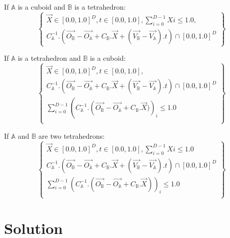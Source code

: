 \documentclass[12pt, a4paper]{article}
\begin{document}
If $\mathbb{A}$ is a cuboid and $\mathbb{B}$ is a tetrahedron:
\begin{equation}
\left\lbrace
\begin{array}{c}
\overrightarrow{X}\in[0.0,1.0]^D,t\in[0.0,1.0],\sum_{i=0}^{D-1}Xi\le1.0,\\
C_\mathbb{A}^{-1}.\left(\overrightarrow{O_\mathbb{B}}-\overrightarrow{O_\mathbb{A}}+C_\mathbb{B}.\overrightarrow{X}+\left(\overrightarrow{V_\mathbb{B}}-\overrightarrow{V_\mathbb{A}}\right).t\right)\cap[0.0,1.0]^D
\end{array}
\right\rbrace
\end{equation}

If $\mathbb{A}$ is a tetrahedron and $\mathbb{B}$ is a cuboid:
\begin{equation}
\left\lbrace
\begin{array}{c}
\overrightarrow{X}\in[0.0,1.0]^D,t\in[0.0,1.0],\\
C_\mathbb{A}^{-1}.\left(\overrightarrow{O_\mathbb{B}}-\overrightarrow{O_\mathbb{A}}+C_\mathbb{B}.\overrightarrow{X}+\left(\overrightarrow{V_\mathbb{B}}-\overrightarrow{V_\mathbb{A}}\right).t\right)\cap[0.0,1.0]^D\\
\sum_{i=0}^{D-1}\left(C_\mathbb{A}^{-1}.\left(\overrightarrow{O_\mathbb{B}}-\overrightarrow{O_\mathbb{A}}+C_\mathbb{B}.\overrightarrow{X})\right)_i\le1.0\\
\end{array}
\right\rbrace
\end{equation}

If $\mathbb{A}$ and $\mathbb{B}$ are two tetrahedrons:
\begin{equation}
\left\lbrace
\begin{array}{c}
\overrightarrow{X}\in[0.0,1.0]^D,t\in[0.0,1.0],\sum_{i=0}^{D-1}Xi\le1.0\\
C_\mathbb{A}^{-1}.(\overrightarrow{O_\mathbb{B}}-\overrightarrow{O_\mathbb{A}}+C_\mathbb{B}.\overrightarrow{X}+\left(\overrightarrow{V_\mathbb{B}}-\overrightarrow{V_\mathbb{A}}\right).t)\cap[0.0,1.0]^D\\
\sum_{i=0}^{D-1}\left(C_\mathbb{A}^{-1}.\left(\overrightarrow{O_\mathbb{B}}-\overrightarrow{O_\mathbb{A}}+C_\mathbb{B}.\overrightarrow{X}\right)\right)_i\le1.0\\
\end{array}
\right\rbrace
\end{equation}





\section{Solution}
\end{document}
